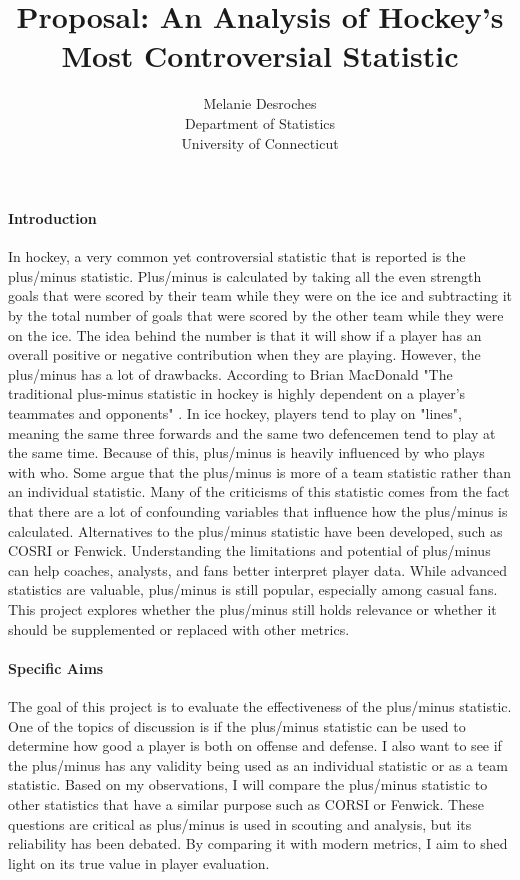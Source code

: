 \documentclass[12pt]{article}
\title{Proposal: An Analysis of Hockey's Most Controversial Statistic}
\author{Melanie Desroches\\
  Department of Statistics\\
  University of Connecticut
}
\begin{document}
\maketitle


\paragraph{Introduction}
In hockey, a very common yet controversial statistic that is reported is the plus/minus statistic. Plus/minus is 
calculated by taking all the even strength goals that were scored by their team while they were on the ice and 
subtracting it by the total number of goals that were scored by the other team while they were on the ice. The 
idea behind the number is that it will show if a player has an overall positive or negative contribution when 
they are playing. However, the plus/minus has a lot of drawbacks. According to Brian MacDonald 
"The traditional plus-minus statistic in hockey is highly dependent on a player’s teammates and opponents" \cite{Macdonald_2011}.
In ice hockey, players tend to play on "lines", meaning the same three forwards and the same two defencemen tend 
to play at the same time. Because of this, plus/minus is heavily influenced by who plays with who. Some argue that 
the plus/minus is more of a team statistic rather than an individual statistic. Many of the criticisms of this statistic 
comes from the fact that there are a lot of confounding variables that influence how the plus/minus is calculated.
Alternatives to the plus/minus statistic have been developed, such as COSRI or Fenwick. Understanding the limitations and
potential of plus/minus can help coaches, analysts, and fans better interpret player data. While advanced statistics are valuable, 
plus/minus is still popular, especially among casual fans. This project explores whether the plus/minus still holds relevance or 
whether it should be supplemented or replaced with other metrics.


\paragraph{Specific Aims}
The goal of this project is to evaluate the effectiveness of the plus/minus statistic. One of the topics of discussion is if the 
plus/minus statistic can be used to determine how good a player is both on offense and defense. I also want to see if the plus/minus 
has any validity being used as an individual statistic or as a team statistic. Based on my observations, I will compare the plus/minus 
statistic to other statistics that have a similar purpose such as CORSI or Fenwick. These questions are critical as plus/minus is used 
in scouting and analysis, but its reliability has been debated. By comparing it with modern metrics, I aim to shed light on its true 
value in player evaluation.
\end{document}
